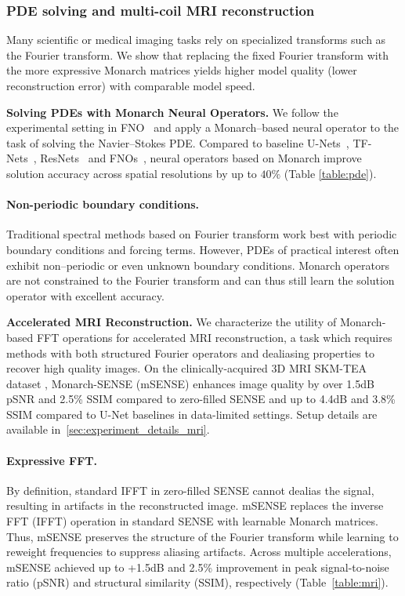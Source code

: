 \subsubsection{PDE solving and multi-coil MRI reconstruction}
\label{subsec:pde_mri}

Many scientific or medical imaging tasks rely on specialized transforms such as the Fourier transform. We show that replacing the fixed Fourier transform with the more expressive Monarch matrices yields higher model quality (lower reconstruction error) with comparable model speed.

\textbf{Solving PDEs with Monarch Neural Operators.} We follow the experimental setting in FNO~\citep{li2020fourier} and apply a Monarch--based neural operator to the task of solving the Navier--Stokes PDE. Compared to baseline U-Nets~\citep{ronneberger2015u}, TF-Nets~\citep{wang2020towards}, ResNets~\citep{he2016deep} and FNOs~\cite{li2020fourier}, neural operators based on Monarch improve solution accuracy across spatial resolutions by up to $40\%$ (Table \ref{table:pde}).  

\paragraph{Non-periodic boundary conditions.} Traditional spectral methods based on Fourier transform work best with periodic boundary conditions and forcing terms. However, PDEs of practical interest often exhibit non--periodic or even unknown boundary conditions. Monarch operators are not constrained to the Fourier transform and can thus still learn the solution operator with excellent accuracy.

\textbf{Accelerated MRI Reconstruction.} We characterize the utility of Monarch-based FFT operations for accelerated MRI reconstruction, a task which requires methods with both structured Fourier operators and dealiasing properties to recover high quality images. On the clinically-acquired 3D MRI SKM-TEA dataset \citep{desai2021skm}, Monarch-SENSE (mSENSE) enhances image quality by over 1.5dB pSNR and 2.5\% SSIM compared to zero-filled SENSE and up to 4.4dB and 3.8\% SSIM compared to U-Net baselines in data-limited settings. Setup details are available in~\ref{sec:experiment_details_mri}.

\paragraph{Expressive FFT.} By definition, standard IFFT in zero-filled SENSE cannot dealias the signal, resulting in artifacts in the reconstructed image. mSENSE replaces the inverse FFT (IFFT) operation in standard SENSE with learnable Monarch matrices. Thus, mSENSE preserves the structure of the Fourier transform while learning to reweight frequencies to suppress aliasing artifacts. Across multiple accelerations, mSENSE achieved up to +1.5dB and 2.5\% improvement in peak signal-to-noise ratio (pSNR) and structural similarity (SSIM), respectively (Table~\ref{table:mri}).

